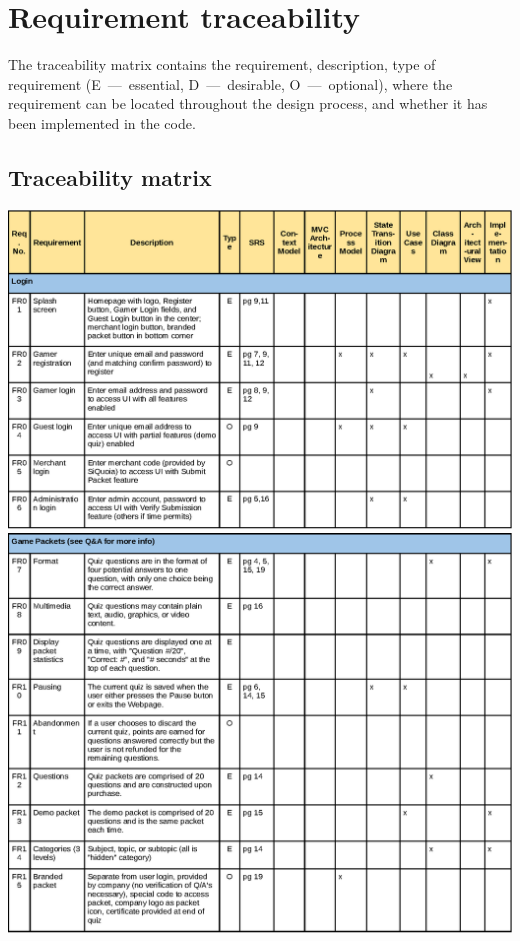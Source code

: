 \documentclass[12pt]{article}
\begin{document}
\section{Requirement traceability}
The traceability matrix contains the requirement, description, type of 
requirement (E~---~essential, D~---~desirable, O~---~optional), where the 
requirement can be located throughout the design process, and whether 
it has been implemented in the code.

\subsection{Traceability matrix}
\begin{center}
\includegraphics[width=\textwidth]{trace0}
\newpage
\includegraphics[width=\textwidth]{trace1}

\end{center}
\end{document}
